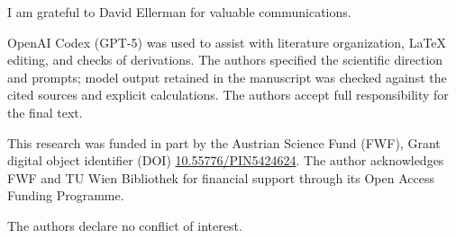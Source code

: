 \documentclass[aps,pra,reprint,nofootinbib]{revtex4-2}
\begin{document}
\begin{acknowledgments}
I am grateful to David Ellerman for valuable communications.

OpenAI Codex (GPT-5) was used to assist with literature organization, \LaTeX{}
editing, and checks of derivations.  The authors specified the scientific
direction and prompts; model output retained in the manuscript was checked
against the cited sources and explicit calculations.  The authors accept full
responsibility for the final text.

This research was funded in part by the Austrian
Science Fund (FWF), Grant digital object identifier (DOI)
\href{https://doi.org/10.55776/PIN5424624}{10.55776/PIN5424624}.
The author acknowledges FWF and TU Wien Bibliothek for financial support through its
Open Access Funding Programme.

The authors declare no conflict of interest.
\end{acknowledgments}


\end{document}
